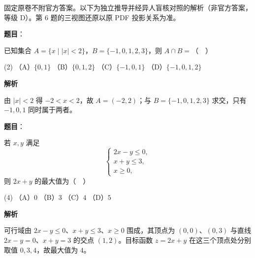 

\begin{gktip}
固定原卷不附官方答案。以下为独立推导并经异人盲核对照的解析（非官方答案，等级 D）。第 6 题的三视图还原以原 PDF 投影关系为准。
\end{gktip}

\begin{answer}

\textbf{题目}：

已知集合 \(A=\{x\mid |x|<2\}\)，\(B=\{-1,0,1,2,3\}\)，则 \(A\cap B=\)（　）

\begin{gkopts}(2)
\task （A）\(\{0,1\}\)
\task （B）\(\{0,1,2\}\)
\task （C）\(\{-1,0,1\}\)
\task （D）\(\{-1,0,1,2\}\)
\end{gkopts}

\textbf{解析}

由 \(|x|<2\) 得 \(-2<x<2\)，故 \(A=(-2,2)\)；与 \(B=\{-1,0,1,2,3\}\) 求交，只有 \(-1,0,1\) 同时属于两者。


\end{answer}
\begin{answer}

\textbf{题目}：

若 \(x,y\) 满足
\nopagebreak[4]
\[
\begin{cases}
2x-y\leqslant 0,\\
x+y\leqslant 3,\\
x\geqslant 0,
\end{cases}
\]
则 \(2x+y\) 的最大值为（　）

\begin{gkopts}(4)
\task （A）\(0\)
\task （B）\(3\)
\task （C）\(4\)
\task （D）\(5\)
\end{gkopts}

\textbf{解析}

可行域由 \(2x-y\leqslant0\)、\(x+y\leqslant3\)、\(x\geqslant0\) 围成，其顶点为 \((0,0)\)、\((0,3)\) 与直线 \(2x-y=0\)、\(x+y=3\) 的交点 \((1,2)\)。目标函数 \(z=2x+y\) 在这三个顶点处分别取值 \(0,3,4\)，故最大值为 \(4\)。


\end{answer}
